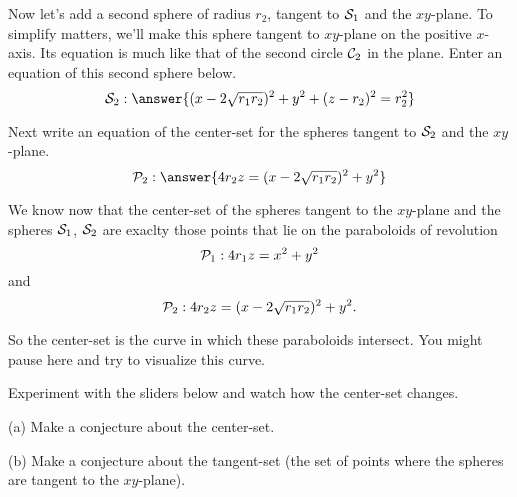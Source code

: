 \documentclass{ximera}
\begin{document}
\begin{question}  \label{Q365434:Spheres}
Now let's add a second sphere of radius $r_2$, tangent to ${\cal S}_1$ and the $xy$-plane. To simplify matters, we'll make this sphere tangent to $xy$-plane on the positive $x$-axis. Its equation is much like that of the second circle ${\cal C}_2$ in the plane. Enter an equation of this second sphere below.
\[
   {\cal S}_2: \answer{(x-2\sqrt{r_1r_2})^2 + y^2 + (z-r_2)^2 = r_2^2}
\]

Next write an equation of the center-set for the spheres tangent to ${\cal S}_2$ and the $xy$-plane.
\[
   {\cal P}_2:  \answer{4r_2z = (x-2\sqrt{r_1r_2})^2 + y^2}
\]

\end{question}



We know now that the center-set of the spheres tangent to the $xy$-plane and the spheres ${\cal S}_1$, ${\cal S}_2$ are exaclty those points that lie on the paraboloids of revolution
\[
   {\cal P}_1:  4 r_1z  = x^2 + y^2
\]
and 
\[
     {\cal P}_2:  4r_2z = (x-2\sqrt{r_1r_2})^2 + y^2 .
\]

So the center-set is the curve in which these paraboloids intersect. You might pause here and try to visualize this curve.


\begin{exploration}  \label{Exsdsdfsdf:Spheres}
Experiment with the sliders below and watch how the center-set changes. 

(a) Make a conjecture about the center-set.

(b) Make a conjecture about the tangent-set (the set of points where the spheres are tangent to the $xy$-plane).

 
\begin{onlineOnly}
    \begin{center}
\end{center}
\end{onlineOnly}


\end{exploration}
\end{document}
